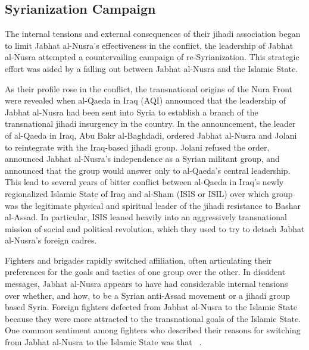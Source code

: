 \subsection{Syrianization Campaign}

The internal tensions and external consequences of their jihadi association began to limit Jabhat al-Nusra's effectiveness in the conflict, the leadership of Jabhat al-Nusra attempted a countervailing campaign of re-Syrianization. This strategic effort was aided by a falling out between Jabhat al-Nusra and the Islamic State.
  
As their profile rose in the conflict, the transnational origins of the Nura Front were revealed when al-Qaeda in Iraq  (AQI) announced that the leadership of Jabhat al-Nusra had been sent into Syria to establish a branch of the transnational jihadi insurgency in the country. 
In the announcement, the leader of al-Qaeda in Iraq, Abu Bakr al-Baghdadi, ordered Jabhat al-Nusra and Jolani to reintegrate with the Iraq-based jihadi group. 
Jolani refused the order, announced Jabhat al-Nusra's independence as a Syrian militant group, and announced that the group would answer only to al-Qaeda's central leadership. This lead to several years of bitter conflict between al-Qaeda in Iraq's newly regionalized Islamic State of Iraq and al-Sham (ISIS or ISIL) over which group was the legitimate physical and spiritual leader of the jihadi resistance to Bashar al-Assad.  In particular, ISIS leaned heavily into an aggressively transnational mission of social and political revolution, which they used to try to detach Jabhat al-Nusra's foreign cadres. 

Fighters and brigades rapidly switched affiliation, often articulating their preferences for the goals and tactics of one group over the other.  In dissident messages, Jabhat al-Nusra appears to have had considerable internal tensions over whether, and how, to be a Syrian anti-Assad movement or a jihadi group based Syria.  Foreign fighters defected from Jabhat al-Nusra to the Islamic State because they were more attracted to the transnational goals of the Islamic State. One common sentiment among fighters who described their reasons for switching from Jabhat al-Nusra to the Islamic State was that ~\autocite[127]{mironova2019freedom}.

